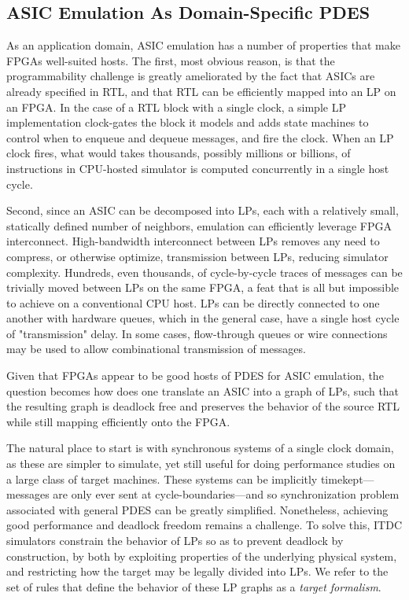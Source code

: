 \subsection{ASIC Emulation As Domain-Specific PDES}

As an application domain, ASIC emulation has a number of properties that make
FPGAs well-suited hosts. The first, most obvious reason, is that the programmability challenge is
greatly ameliorated by the fact that ASICs are already specified in RTL, and
that RTL can be efficiently mapped into an LP on an FPGA. In the case of a RTL block with a single clock, a
simple LP implementation clock-gates the block it models and adds state
machines to control when to enqueue and dequeue messages, and fire the clock.
When an LP clock fires, what would takes thousands, possibly
millions or billions, of instructions in CPU-hosted simulator is computed
concurrently in a single host cycle.

Second, since an ASIC can be decomposed into LPs, each with a relatively small,
statically defined number of neighbors, emulation can efficiently leverage FPGA
interconnect. High-bandwidth interconnect between LPs removes any need to compress, or
otherwise optimize, transmission between LPs, reducing simulator complexity.
Hundreds, even thousands, of cycle-by-cycle traces of messages can be trivially
moved between LPs on the same FPGA, a feat that is all but impossible to
achieve on a conventional CPU host. LPs can be directly connected to one another with
hardware queues, which in the general case, have a single host cycle of
"transmission" delay. In some cases, flow-through queues or wire connections
may be used to allow combinational transmission of messages.

Given that FPGAs appear to be good hosts of PDES for ASIC emulation,
the question becomes how does one translate an ASIC into a graph of
LPs, such that the resulting graph is deadlock free and preserves the behavior of the source RTL while still mapping
efficiently onto the FPGA.

The natural place to start is with synchronous systems of a single clock domain,
as these are simpler to simulate, yet still useful for doing performance
studies on a large class of target machines.  These systems can be implicitly timekept---messages are only ever sent at
cycle-boundaries---and so synchronization problem associated with general PDES
can be greatly simplified. Nonetheless, achieving good performance and deadlock
freedom remains a challenge. To solve this, ITDC simulators constrain the
behavior of LPs so as to prevent deadlock by construction, by both by
exploiting properties of the underlying physical system, and restricting how
the target may be legally divided into LPs. We refer to the set of rules that
define the behavior of these LP graphs as a \emph{target formalism}.

